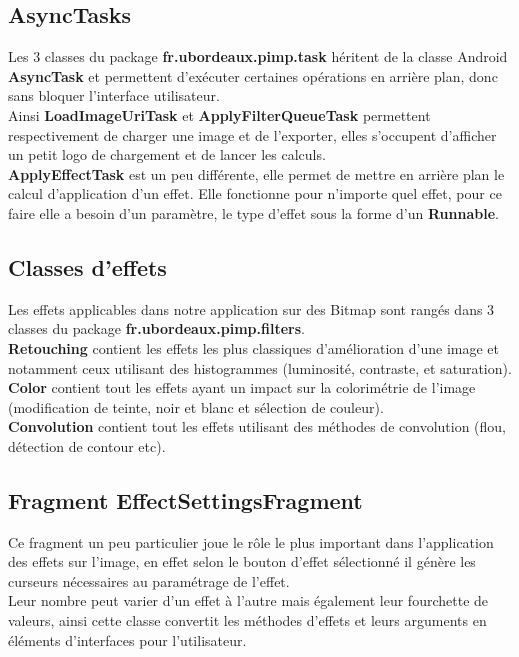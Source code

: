 \subsection{AsyncTasks}
Les 3 classes du package \textbf{fr.ubordeaux.pimp.task} héritent de la classe Android \textbf{AsyncTask} et permettent d'exécuter certaines opérations en arrière plan, donc sans bloquer l'interface utilisateur.
\\
Ainsi \textbf{LoadImageUriTask} et \textbf{ApplyFilterQueueTask} permettent respectivement de charger une image et de l'exporter, elles s'occupent d'afficher un petit logo de chargement et de lancer les calculs.
\\
\textbf{ApplyEffectTask} est un peu différente, elle permet de mettre en arrière plan le calcul d'application d'un effet. Elle fonctionne pour n'importe quel effet, pour ce faire elle a besoin d'un paramètre, le type d'effet sous la forme d'un \textbf{Runnable}.

\subsection{Classes d'effets}
Les effets applicables dans notre application sur des Bitmap sont rangés dans 3 classes du package \textbf{fr.ubordeaux.pimp.filters}.
\\
\textbf{Retouching} contient les effets les plus classiques d'amélioration d'une image et notamment ceux utilisant des histogrammes (luminosité, contraste, et saturation).
\\
\textbf{Color} contient tout les effets ayant un impact sur la colorimétrie de l'image (modification de teinte, noir et blanc et sélection de couleur).
\\
\textbf{Convolution} contient tout les effets utilisant des méthodes de convolution (flou, détection de contour etc).
\\

\subsection{Fragment \textbf{EffectSettingsFragment}}
Ce fragment un peu particulier joue le rôle le plus important dans l'application des effets sur l'image, en effet selon le bouton d'effet sélectionné il génère les curseurs nécessaires au paramétrage de l'effet.
\\
Leur nombre peut varier d'un effet à l'autre mais également leur fourchette de valeurs, ainsi cette classe convertit les méthodes d'effets et leurs arguments en éléments d'interfaces pour l'utilisateur.

